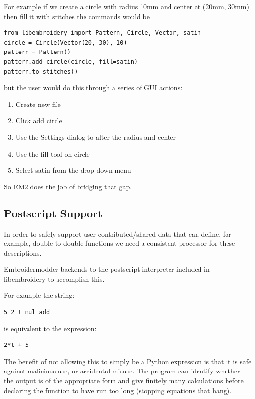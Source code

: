 \documentclass{report}
\begin{document}
For example if we create a circle with radius 10mm and center at (20mm, 30mm) then fill it with stitches the commands would be

\begin{lstlisting}
from libembroidery import Pattern, Circle, Vector, satin
circle = Circle(Vector(20, 30), 10)
pattern = Pattern()
pattern.add_circle(circle, fill=satin)
pattern.to_stitches()
\end{lstlisting}

but the user would do this through a series of GUI actions:

\begin{enumerate}
\item Create new file
\item Click add circle
\item Use the Settings dialog to alter the radius and center
\item Use the fill tool on circle
\item Select satin from the drop down menu
\end{enumerate}

So EM2 does the job of bridging that gap.

\subsection{Postscript Support}

In order to safely support user contributed/shared data that can
define, for example, double to double functions we need a consistent
processor for these descriptions.

Embroidermodder backends to the postscript interpreter included
in libembroidery to accomplish this.

For example the string:

\begin{verbatim}
5 2 t mul add
\end{verbatim}

is equivalent to the expression:

\begin{verbatim}
2*t + 5
\end{verbatim}

The benefit of not allowing this to simply be a Python expression
is that it is safe against malicious use, or accidental misuse.
The program can identify whether the output is of the appropriate
form and give finitely many calculations before declaring the
function to have run too long (stopping equations that hang).
\end{document}

